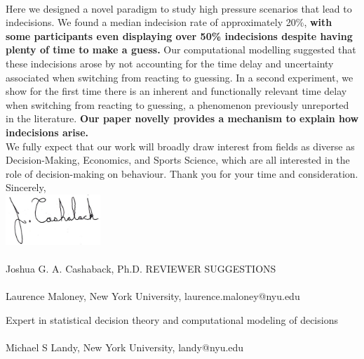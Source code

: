 \documentclass[12pt]{article}
\begin{document}
\vspace{3mm}
\\
Here we designed a novel paradigm to study high pressure scenarios that lead to indecisions. We found a median indecision rate of approximately 20\%, \textbf{with some participants even displaying over 50\% indecisions despite having plenty of time to make a guess.} Our computational modelling suggested that these indecisions arose by not accounting for the time delay and uncertainty associated when switching from reacting to guessing. In a second experiment, we show for the first time there is an inherent and functionally relevant time delay when switching from reacting to guessing, a phenomenon previously unreported in the literature. \textbf{Our paper novelly provides a mechanism to explain how indecisions arise.}
\vspace{3mm}
\\
We fully expect that our work will broadly draw interest from fields as diverse as Decision-Making, Economics, and Sports Science, which are all interested in the role of decision-making on behaviour.
Thank you for your time and consideration.
\vspace{3mm}
\\
Sincerely, 
\vspace{3mm}
\\
\includegraphics[height=0.75in]{signature}
\\
\vspace{-3.5mm}
\\
Joshua G. A. Cashaback, Ph.D.
\thispagestyle{fancy}
\rfoot{\textcolor{myudblue}{\thepage}}
\newpage
\noindent \textcolor{myudblue}{REVIEWER SUGGESTIONS}
\\
\\
Laurence Maloney, New York University, laurence.maloney@nyu.edu

Expert in statistical decision theory and computational modeling of decisions
\\
\\
Michael S Landy, New York University, landy@nyu.edu
\end{document}
